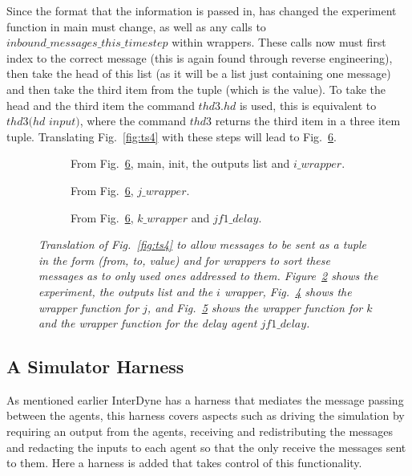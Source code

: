 \documentclass{article}
\begin{document}
Since the format that the information is passed in, has changed the experiment function in main must change, as well as any calls to $inbound\_messages\_this\_timestep$ within wrappers. These calls now must first index to the correct message (this is again found through reverse engineering), then take the head of this list (as it will be a list just containing one message) and then take the third item from the tuple (which is the value). To take the head and the third item the command $thd3.hd$ is used, this is equivalent to $thd3(hd$ $input)$, where the command $thd3$ returns the third item in a three item tuple. Translating Fig.~\ref{fig:ts4} with these steps will lead to Fig.~\ref{fig:ts5}.
\begin{figure}[H]
	\centering
	\begin{subfigure}[b]{1\textwidth}
	
	\caption{From Fig.~\ref{fig:ts5}, main, init, the outputs list and $i\_wrapper$.  }
        \label{fig:ts51}
	\end{subfigure}
	\caption*{}
\end{figure}
	
\begin{figure}[H]\ContinuedFloat
	\centering
	\begin{subfigure}[b]{1\textwidth}
	
	\caption{From Fig.~\ref{fig:ts5}, $j\_wrapper$.  }
        \label{fig:ts52}
	\end{subfigure}
	\caption*{}
\end{figure}
	
\begin{figure}[H]\ContinuedFloat
	\centering
	\begin{subfigure}[b]{1\textwidth}
	
	\caption{From Fig.~\ref{fig:ts5}, $k\_wrapper$ and $jf1\_delay$.  }
        \label{fig:ts53}
	\end{subfigure}
	\caption{\it Translation of Fig.~\ref{fig:ts4} to allow messages to be sent as a tuple in the form (from, to, value) and for wrappers to sort these messages as to only used ones addressed to them. Figure~\ref{fig:ts51} shows the experiment, the outputs list and the $i$ wrapper, Fig.~\ref{fig:ts52} shows the wrapper function for $j$, and Fig.~\ref{fig:ts53} shows the wrapper function for $k$ and the wrapper function for the delay agent $jf1\_delay$.}
	\label{fig:ts5}
\end{figure} 



\subsection{A Simulator Harness}
As mentioned earlier InterDyne has a harness that mediates the message passing between the agents, this harness covers aspects such as driving the simulation by requiring an output from the agents, receiving and redistributing the messages and redacting the inputs to each agent so that the only receive the messages sent to them. Here a harness is added that takes control of this functionality. 
\end{document}
